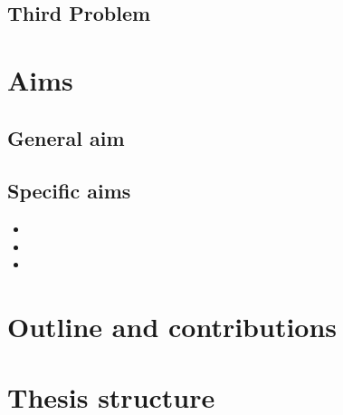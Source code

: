 \subsection{Third Problem}



\section{Aims}\label{sec:objectives}

\subsection{General aim}



\subsection{Specific aims}

    \begin{itemize}

        \item  
        
        \item 

        \item 


    \end{itemize}

\section{Outline and contributions}



\section{Thesis structure}
